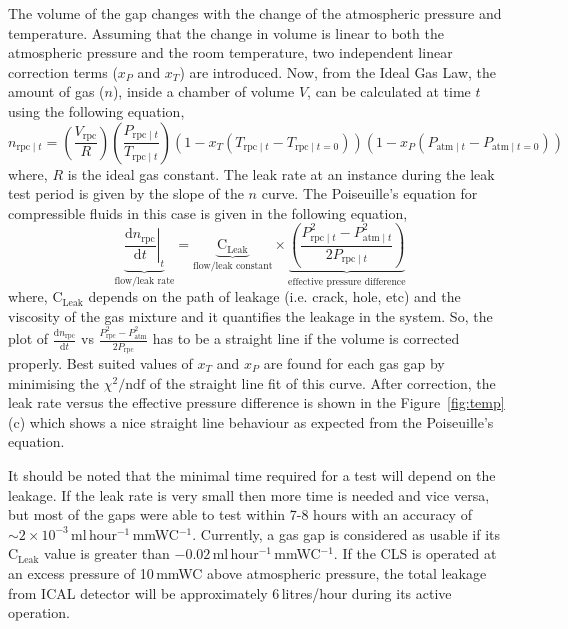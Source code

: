 \documentclass[a4paper,12pt,twoside,openany]{article}
\begin{document}
The volume of the gap changes with the change of the atmospheric
pressure and temperature. Assuming that the change in volume is linear
to both the atmospheric pressure and the room temperature, two
independent linear correction terms ($x_P$ and $x_T$) are introduced.
Now, from the Ideal Gas Law, the amount of gas ($n$), inside a chamber
of volume $V$, can be calculated at time $t$ using the following
equation,
\begin{equation}
  n_{\textrm{rpc}\mid t}=\left(\frac{V_{\textrm{rpc}}}{R}\right)\left(\frac{P_{\textrm{rpc}\mid t}}{T_{\textrm{rpc}\mid t}}\right)\left(1-x_T\left(T_{\textrm{rpc}\mid t}-T_{\textrm{rpc}\mid t=0}\right)\right)\left(1-x_P\left(P_{\textrm{atm}\mid t}-P_{\textrm{atm}\mid t=0}\right)\right) \label{eq:ct}
\end{equation}
where, $R$ is the ideal gas constant. The leak rate at an instance
during the leak test period is given by the slope of the $n$ curve.
The Poiseuille's equation \cite{poiseuille} for compressible fluids in
this case is given in the following equation,
\begin{equation}
  \underbrace{\left.\frac{\mathrm{d}n_{\textrm{rpc}}}{\mathrm{d}t}\right| _t}_\text{flow/leak rate}=\underbrace{\textrm{C}_{\textrm{Leak}}}_\text{flow/leak constant}\times\underbrace{\left(\frac {P_{{\textrm{rpc}\mid t} }^{2}-P_{{\textrm{atm}\mid t} }^{2}}{2P_{{\textrm{rpc}\mid t} }}\right)}_\text{effective pressure difference}\label{eq:poiseuille}
\end{equation}
where, $\textrm{C}_{\textrm{Leak}}$ depends on the path of leakage
(i.e. crack, hole, etc) and the viscosity of the gas mixture and it
quantifies the leakage in the system. So, the plot of
$\frac{\mathrm{d}n_{\textrm{rpc}}}{\mathrm{d}t}$ vs
$\frac{P_{\textrm{rpc}}^{2}-P_{\textrm{atm}}^{2}}{2P_{\textrm{rpc}}}$ has to be
a straight line if the volume is corrected properly. Best suited
values of $x_T$ and $x_P$ are found for each gas gap by minimising the
$\chi^2/\textrm{ndf}$ of the straight line fit of this curve. After
correction, the leak rate versus the effective pressure difference is
shown in the Figure~\ref{fig:temp}(c) which shows a nice straight line
behaviour as expected from the Poiseuille's equation. 

It should be noted that the minimal time required for a test will
depend on the leakage. If the leak rate is very small then more time
is needed and vice versa, but most of the gaps were able to test
within 7-8 hours with an accuracy of
$\sim 2\times 10^{-3}$\,ml\,hour$^{-1}$\,mmWC$^{-1}$. Currently, a gas
gap is considered as usable if its $\textrm{C}_{\textrm{Leak}}$ value is
greater than $-0.02$\,ml\,hour$^{-1}$\,mmWC$^{-1}$. If the CLS is
operated at an excess pressure of 10\,mmWC above atmospheric pressure,
the total leakage from ICAL detector will be approximately
6\,litres/hour during its active operation.
\end{document}
